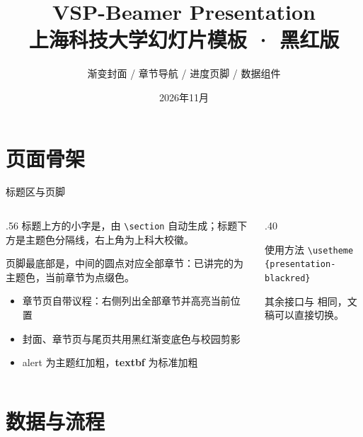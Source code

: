 \documentclass[aspectratio=169,10pt]{beamer}
\title[VSP-Beamer Presentation]{VSP-Beamer Presentation\\上海科技大学幻灯片模板 · 黑红版}
\subtitle{渐变封面 / 章节导航 / 进度页脚 / 数据组件}
\date{2026年11月}
\begin{document}
\VSPtitleframe

\section{页面骨架}

\begin{frame}[t]{标题区与页脚}
\begin{columns}[T,onlytextwidth]
  \begin{column}{.56\textwidth}
    标题上方的小字是，由 \texttt{\textbackslash section} 自动生成；标题下方是主题色分隔线，右上角为上科大校徽。

    页脚最底部是，中间的圆点对应全部章节：已讲完的为主题色，当前章节为点缀色。

    \begin{itemize}
      \item 章节页自带议程：右侧列出全部章节并高亮当前位置
      \item 封面、章节页与尾页共用黑红渐变底色与校园剪影
      \item \alert{alert} 为主题红加粗，\textbf{textbf} 为标准加粗
    \end{itemize}
  \end{column}
  \begin{column}{.40\textwidth}
    \begin{vspquote}{使用方法}
      \texttt{\textbackslash usetheme}\\\texttt{\{presentation-blackred\}}

      其余接口与  相同，文稿可以直接切换。
    \end{vspquote}
      
  \end{column}
\end{columns}
\end{frame}

\section{数据与流程}
\end{document}

